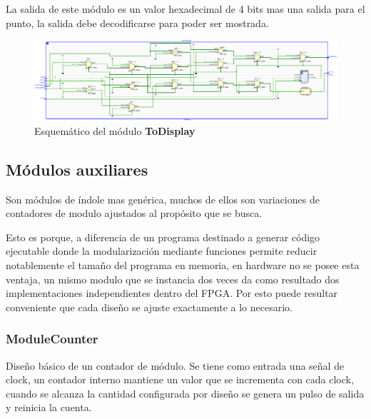 \documentclass[12pt]{article}
\begin{document}
La salida de este módulo es un valor hexadecimal de 4 bits mas una salida para el punto, la salida debe decodificarse para poder ser mostrada.
\begin{figure}[H]
    \centering
    \includegraphics[width=\textwidth]{to-display-crop}
    \caption{Esquemático del módulo \textbf{ToDisplay}}
\end{figure}

\subsection{Módulos auxiliares}
Son módulos de índole mas genérica, muchos de ellos son variaciones de contadores de modulo ajustados al propósito que se busca.

Esto es porque, a diferencia de un programa destinado a generar código ejecutable donde la modularización mediante funciones permite reducir notablemente el tamaño del programa en memoria, en hardware no se posee esta ventaja, un mismo modulo que se instancia dos veces da como resultado dos implementaciones independientes dentro del FPGA. Por esto puede resultar conveniente que cada diseño se ajuste exactamente a lo necesario.


\subsubsection{ModuleCounter}
Diseño básico de un contador de módulo. Se tiene como entrada una señal de clock, un contador interno mantiene un valor que se incrementa con cada clock, cuando se alcanza la cantidad configurada por diseño se genera un pulso de salida y reinicia la cuenta.
\end{document}
